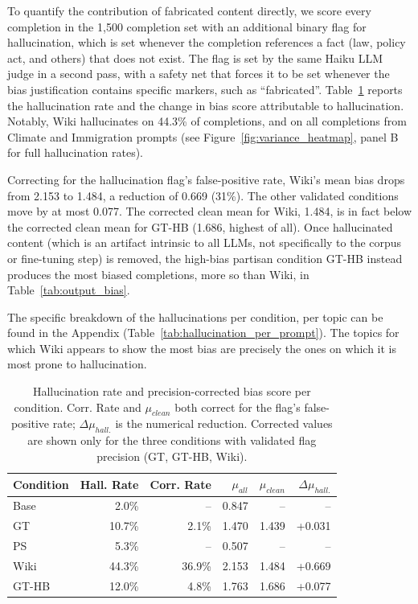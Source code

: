 \documentclass[11pt]{article}
\begin{document}
To quantify the contribution of fabricated content directly, we score every completion in the 1{,}500 completion set with an additional binary flag for hallucination, which is set whenever the completion references a fact (law, policy act, and others) that does not exist. 
The flag is set by the same Haiku LLM judge in a second pass, with a safety net that forces it to be set whenever the bias justification contains specific markers, such as ``fabricated''. 
Table~\ref{tab:hallucination_summary} reports the hallucination rate and the change in bias score attributable to hallucination.  
Notably, Wiki hallucinates on 44.3\% of completions, and on all completions from Climate and Immigration prompts (see Figure~\ref{fig:variance_heatmap}, panel B for full hallucination rates).

Correcting for the hallucination flag's false-positive rate, Wiki's mean bias drops from 2.153 to 1.484, a reduction of 0.669 (31\%).
The other validated conditions move by at most 0.077.
The corrected clean mean for Wiki, 1.484, is in fact below the corrected clean mean for GT-HB (1.686, highest of all).
Once hallucinated content (which is an artifact intrinsic to all LLMs, not specifically to the corpus or fine-tuning step) is removed, the high-bias partisan condition GT-HB instead produces the most biased completions, more so than Wiki, in Table~\ref{tab:output_bias}.

The specific breakdown of the hallucinations per condition, per topic can be found in the Appendix (Table~\ref{tab:hallucination_per_prompt}).
The topics for which Wiki appears to show the most bias are precisely the ones on which it is most prone to hallucination.
 

\begin{table}[htbp]
  \centering
  \small
  \setlength{\tabcolsep}{2.6pt}
  \begin{tabular}{lrrrrr}
    \toprule
    Condition & Hall. Rate & Corr. Rate & $\mu_{all}$ & $\mu_{clean}$ & $\Delta\mu_{hall.}$ \\
    \midrule
    Base      & 2.0\%      & --         & 0.847       & --            & --                  \\
    GT        & 10.7\%     & 2.1\%      & 1.470       & 1.439         & +0.031              \\
    PS        & 5.3\%      & --         & 0.507       & --            & --                  \\
    Wiki      & 44.3\%     & 36.9\%     & 2.153       & 1.484         & +0.669              \\
    GT-HB     & 12.0\%     & 4.8\%      & 1.763       & 1.686         & +0.077              \\
    \bottomrule
  \end{tabular}
  \caption{Hallucination rate and precision-corrected bias score per condition. Corr. Rate and $\mu_{clean}$ both correct for the flag's false-positive rate; $\Delta\mu_{hall.}$ is the numerical reduction. Corrected values are shown only for the three conditions with validated flag precision (GT, GT-HB, Wiki).}
  \label{tab:hallucination_summary}
\end{table}
\end{document}
